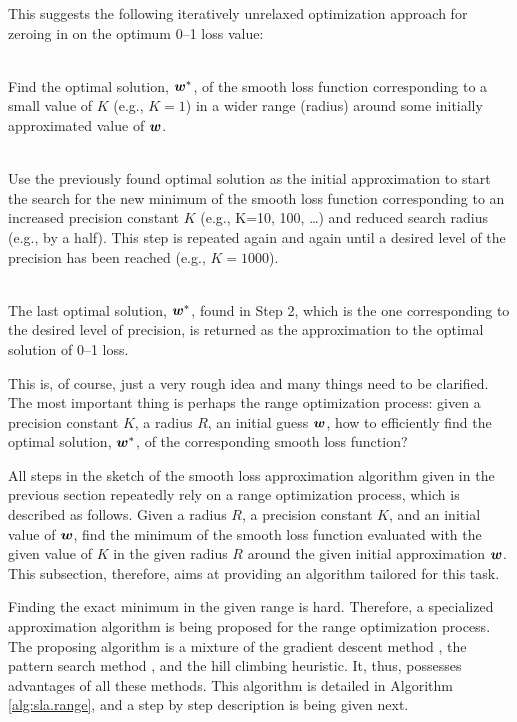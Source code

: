 This suggests the following iteratively unrelaxed optimization approach
for zeroing in on the optimum 0--1 loss value:
\begin{description}
\setlength{\itemsep}{0cm}
\setlength{\parskip}{0cm}
\item[Step 1:] \hfill \\ Find the optimal solution, $\boldsymbol{w}^*$, of the
  smooth loss function corresponding to a small value of $K$ (e.g.,
  $K=1$) in a wider range (radius) around some initially approximated
  value of $\boldsymbol{w}$.
\item[Step 2:] \hfill \\ Use the previously found optimal solution as
  the initial approximation to start the search for the new minimum of
  the smooth loss function corresponding to an increased precision
  constant $K$ (e.g., K=10, 100, \dots) and reduced search radius
  (e.g., by a half). This step is repeated again and again until a
  desired level of the precision has been reached (e.g., $K=1000$).
\item[Step 3:] \hfill \\ The last optimal solution, $\boldsymbol{w}^*$, found in
  Step 2, which is the one corresponding to the desired level of
  precision, is returned as the approximation to the optimal solution
  of 0--1 loss.
\end{description}

This is, of course, just a very rough idea and many things need to be
clarified. The most important thing is perhaps the range optimization
process: given a precision constant $K$, a radius $R$, an initial
guess $\boldsymbol{w}$, how to efficiently find the optimal solution, $\boldsymbol{w}^*$, of
the corresponding smooth loss function?

All steps in the sketch of the smooth loss approximation algorithm
given in the previous section repeatedly rely on a range optimization
process, which is described as follows. Given a radius $R$, a
precision constant $K$, and an initial value of $\boldsymbol{w}$, find the minimum
of the smooth loss function evaluated with the given value of $K$ in
the given radius $R$ around the given initial approximation $\boldsymbol{w}$. This
subsection, therefore, aims at providing an algorithm tailored for
this task.

Finding the exact minimum in the given range is hard.  Therefore, a
specialized approximation algorithm is being proposed for the range
optimization process. The proposing algorithm is a mixture of the
gradient descent method \cite{Cauchy}, the pattern search method
\cite{Hooke}, and the hill climbing heuristic. It, thus, possesses
advantages of all these methods. This algorithm is detailed in
Algorithm \ref{alg:sla.range}, and a step by step description is being
given next.

